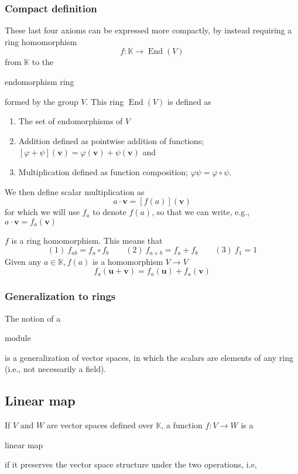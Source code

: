 \documentclass{article}
\DeclareMathOperator{\End}{End}
\newenvironment{enumerated}{ 
\begin{enumerate}
\setlength{\itemsep}{0pt}
\setlength{\parskip}{0pt}
\setlength{\parsep}{0pt}     
}{\end{enumerate}}
\renewcommand{\vec}[1]{\mathbf{#1}}
\begin{document}
\subsubsection*{Compact definition}
These last four axioms can be expressed more compactly, by instead requiring a ring homomorphism
$$ f : \mathbb{K} \rightarrow \End(V) $$
from $\mathbb{K}$ to the \begin{em}endomorphism ring\end{em} formed by the group $V.$ This ring $\End(V)$ is defined as
\begin{enumerated}
  \item The set of endomorphisms of $V$
  \item Addition defined as pointwise addition of functions; $ \left[\varphi + \psi\right](\vec{v}) = \varphi(\vec{v}) + \psi(\vec{v}) $ and
  \item Multiplication defined as function composition; $ \varphi\psi = \varphi \circ \psi. $
\end{enumerated}

We then define scalar multiplication as
$$ a \cdot \vec{v} = \left[f(a)\right](\vec{v}) $$
for which we will use $f_a$ to denote $f(a)$, so that we can write, e.g., $ a \cdot \vec{v} = f_a(\vec{v}) $

$f$ is a ring homomorphism. This means that
$$
(1)\ f_{ab} = f_a \circ f_b \quad \quad 
(2)\ f_{a + b} = f_a + f_b \quad \quad 
(3)\ f_1 = 1
$$
Given any $a \in \mathbb{K}, f(a)$ is a homomorphism $V \rightarrow V$
$$
f_a(\vec{u} + \vec{v}) = f_a(\vec{u}) + f_a(\vec{v})
$$

\subsubsection*{Generalization to rings}

The notion of a \begin{em}module\end{em} is a generalization of vector spaces, in which the scalars are elements of any ring (i.e., not necessarily a field).

\subsection*{Linear map}

If $V$ and $W$ are vector spaces defined over $\mathbb{K}$, a function $f : V \rightarrow W$ is a \begin{em}linear map\end{em} if it preserves the vector space structure under the two operations, i.e,
\end{document}
